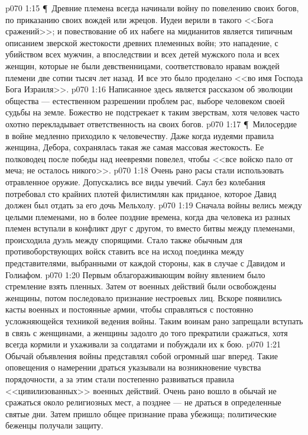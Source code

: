 \vs p070 1:15 \P\ Древние племена всегда начинали войну по повелению своих богов, по приказанию своих вождей или жрецов. Иудеи верили в такого <<Бога сражений>>; и повествование об их набеге на мидианитов является типичным описанием зверской жестокости древних племенных войн; это нападение, с убийством всех мужчин, а впоследствии и всех детей мужского пола и всех женщин, которые не были девственницами, соответствовало нравам вождей племени две сотни тысяч лет назад. И все это было проделано <<во имя Господа Бога Израиля>>.
\vs p070 1:16 Написанное здесь является рассказом об эволюции общества --- естественном разрешении проблем рас, выборе человеком своей судьбы на земле. Божество не подстрекает к таким зверствам, хотя человек часто охотно перекладывает ответственность на своих богов.
\vs p070 1:17 \P\ Милосердие в войне медленно приходило к человечеству. Даже когда иудеями правила женщина, Дебора, сохранялась такая же самая массовая жестокость. Ее полководец после победы над неевреями повелел, чтобы <<все войско пало от меча; не осталось никого>>.
\vs p070 1:18 Очень рано расы стали использовать отравленное оружие. Допускались все виды увечий. Саул без колебания потребовал сто крайних плотей филистимлян как приданое, которое Давид должен был отдать за его дочь Мельхолу.
\vs p070 1:19 Сначала войны велись между целыми племенами, но в более поздние времена, когда два человека из разных племен вступали в конфликт друг с другом, то вместо битвы между племенами, происходила дуэль между спорящими. Стало также обычным для противоборствующих войск ставить все на исход поединка между представителями, выбранными от каждой стороны, как в случае с Давидом и Голиафом.
\vs p070 1:20 Первым облагораживающим войну явлением было стремление взять пленных. Затем от военных действий были освобождены женщины, потом последовало признание нестроевых лиц. Вскоре появились касты военных и постоянные армии, чтобы справляться с постоянно усложняющейся техникой ведения войны. Таким воинам рано запрещали вступать в связь с женщинами, а женщины задолго до того прекратили сражаться, хотя всегда кормили и ухаживали за солдатами и побуждали их к бою.
\vs p070 1:21 Обычай объявления войны представлял собой огромный шаг вперед. Такие оповещения о намерении драться указывали на возникновение чувства порядочности, а за этим стали постепенно развиваться правила <<цивилизованных>> военных действий. Очень рано вошло в обычай не сражаться около религиозных мест, а позднее --- не драться в определенные святые дни. Затем пришло общее признание права убежища; политические беженцы получали защиту.
